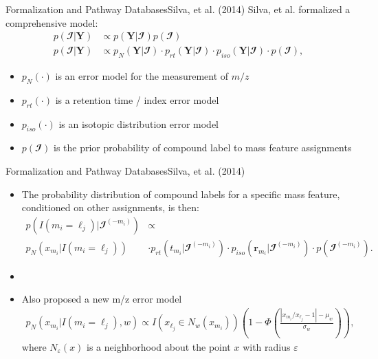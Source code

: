 \documentclass[xcolor=dvipsnames]{beamer}
\begin{document}
\begin{frame}{Formalization and Pathway Databases}{Silva, et al. (2014)}
	\vspace{-12pt}
Silva, et al. formalized a comprehensive model:
			\begin{align*}
			p( \mathbfcal{I}|\textbf{Y}) & \propto p(\textbf{Y}| \mathbfcal{I}) p( \mathbfcal{I}) \\
			p(\mathbfcal{I}|\textbf{Y}) & \propto p_N(\textbf{Y}|\mathbfcal{I}) \cdot p_{rt}(\textbf{Y}|\mathbfcal{I}) \cdot p_{iso}(\textbf{Y}|\mathbfcal{I}) \cdot p( \mathbfcal{I}),
			\end{align*} 
			\begin{itemize}
				\item $p_N(\cdot)$ is an error model for the measurement of $m/z$
				\item $p_{rt}(\cdot)$ is a retention time / index error model
				\item $p_{iso}(\cdot)$ is an isotopic distribution error model
				\item $p( \mathbfcal{I})$ is the prior probability of compound label to mass feature assignments
			\end{itemize}
\end{frame}

\begin{frame}{Formalization and Pathway Databases}{Silva, et al. (2014)}
	\vspace{-12pt}
	\begin{itemize}
		\item The probability distribution of compound labels for a specific mass feature, conditioned on other assignments, is then:
		\begin{align*}
		p( I(m_i=\ell_j )| \mathbfcal{I}^{(-m_i)}) &\propto \\ p_N(x_{m_i}| I(m_i=\ell_j )) &\cdot p_{rt}(t_{m_i}|\mathbfcal{I}^{(-m_i)}) \cdot p_{iso}(\textbf{r}_{m_i}|\mathbfcal{I}^{(-m_i)}) \cdot p( \mathbfcal{I}^{(-m_i)}).
		\end{align*} \pause
		\item[]
		\item Also proposed a new m/z error model
		\begin{align*}
		p_N(x_{m_i}| I(m_i=\ell_j ),w) \propto I(x_{\ell_j}\in N_w(x_{m_i})) \left(1-\Phi\left(\frac{|x_{m_i}/x_{\ell_j}-1|-\mu_w}{\sigma_w}\right) \right),
		\end{align*}
		where $N_\varepsilon(x)$ is a neighborhood about the point $x$ with radius $\varepsilon$
	\end{itemize}
\end{frame}
\end{document}
